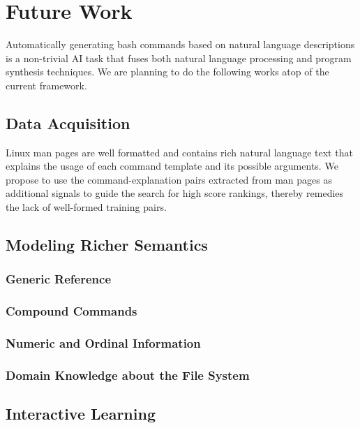 \section{Future Work}

Automatically generating bash commands based on natural language descriptions is a non-trivial AI task that fuses both natural language processing and program synthesis techniques. We are planning to do the following works atop of the current framework.

\subsection{Data Acquisition}

Linux man pages are well formatted and contains rich natural language text that explains the usage of each command template and its possible arguments. We propose to use the command-explanation pairs extracted from man pages as additional signals to guide the search for high score rankings, thereby remedies the lack of well-formed training pairs.

\subsection{Modeling Richer Semantics}
\label{future:semantics}
\subsubsection{Generic Reference}
\subsubsection{Compound Commands}
\subsubsection{Numeric and Ordinal Information}
\subsubsection{Domain Knowledge about the File System}

\subsection{Interactive Learning}